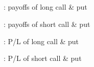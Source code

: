 \subsection*{}
\item {}: payoffs of long call \& put
\item {}: payoffs of short call \& put
\item {}: P/L of long call \& put
\item {}: P/L of short call \& put

